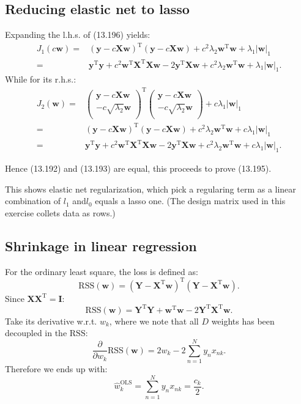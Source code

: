 \documentclass[UTF8]{ctexart}
\begin{document}
\subsection{Reducing elastic net to lasso}
Expanding the l.h.s. of (13.196) yields:
\begin{align}
J_{1}(c\textbf{w})=&(\textbf{y}-c\textbf{X}\textbf{w})^{\text{T}}(\textbf{y}-c\textbf{X}\textbf{w}) + c^{2}\lambda_{2}\textbf{w}^{\text{T}}\textbf{w} + \lambda_{1}|\textbf{w}|_{1}\nonumber \\
=&\textbf{y}^{\text{T}}\textbf{y} + c^{2}\textbf{w}^{\text{T}}\textbf{X}^{\text{T}}\textbf{X}\textbf{w} - 2 \textbf{y}^{\text{T}}\textbf{X}\textbf{w} + c^{2}\lambda_{2}\textbf{w}^{\text{T}}\textbf{w} + \lambda_{1}|\textbf{w}|_{1}.\nonumber
\end{align}
While for its r.h.s.:
\begin{align}
J_{2}(\textbf{w})=&\begin{pmatrix}
\textbf{y}-c\textbf{X}\textbf{w} \\
-c \sqrt{\lambda_{2}}\textbf{w} \\
\end{pmatrix}^{\text{T}}\begin{pmatrix}
\textbf{y}-c\textbf{X}\textbf{w} \\
-c \sqrt{\lambda_{2}}\textbf{w} \\
\end{pmatrix}+c \lambda_{1}|\textbf{w}|_{1}\nonumber \\
=&(\textbf{y}-c\textbf{X}\textbf{w})^{\text{T}}(\textbf{y}-c\textbf{X}\textbf{w})+c^{2}\lambda_{2}\textbf{w}^{\text{T}}\textbf{w} +c \lambda_{1}|\textbf{w}|_{1}\nonumber \\
=&\textbf{y}^{\text{T}}\textbf{y}+ c^{2}\textbf{w}^{\text{T}}\textbf{X}^{\text{T}}\textbf{X}\textbf{w} - 2\textbf{y}^{\text{T}}\textbf{X}\textbf{w}+c^{2}\lambda_{2}\textbf{w}^{\text{T}}\textbf{w}+c\lambda_{1}|\textbf{w}|_{1}.\nonumber
\end{align}

Hence (13.192) and (13.193) are equal, this proceeds to prove (13.195).

This shows elastic net regularization, which pick a regularing term as a linear combination of $l_{1}$ and$l_{0}$ equals a lasso one.
(The design matrix used in this exercise collets data as rows.)

\subsection{Shrinkage in linear regression}
For the ordinary least square, the loss is defined as:
$$\text{RSS}(\textbf{w}) = (\textbf{Y}-\textbf{X}^{\text{T}}\textbf{w})^{\text{T}}(\textbf{Y}-\textbf{X}^{\text{T}}\textbf{w}).$$
Since $\textbf{X}\textbf{X}^{\text{T}}=\textbf{I}$:
$$\text{RSS}(\textbf{w})=\textbf{Y}^{\text{T}}\textbf{Y}+\textbf{w}^{\text{T}}\textbf{w}-2\textbf{Y}^{\text{T}}\textbf{X}^{\text{T}}\textbf{w}.$$
Take its derivative w.r.t. $w_{k}$, where we note that all $D$ weights has been decoupled in the $\text{RSS}$:
$$\frac{\partial}{\partial w_{k}}\text{RSS}(\textbf{w})=2w_{k}-2\sum_{n=1}^{N}y_{n}x_{nk}.$$
Therefore we ends up with:
$$\hat{w}_{k}^{\text{OLS}}=\sum_{n=1}^{N}y_{n}x_{nk}=\frac{c_{k}}{2}.$$
\end{document}
